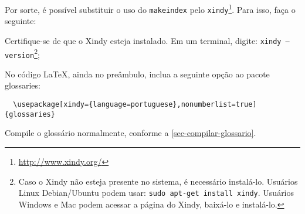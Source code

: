 Por sorte, é possível substituir o uso do \texttt{makeindex}
pelo \texttt{xindy}\footnote{\url{http://www.xindy.org/}}. Para isso, faça o
seguinte:

\begin{alineas}
  \item Certifique-se de que o Xindy esteja instalado. Em um terminal, digite:
  \texttt{xindy --version}\footnote{Caso o Xindy não esteja presente no sistema, é necessário
    instalá-lo. Usuários Linux Debian/Ubuntu podem usar: \texttt{sudo
    apt-get install xindy}. Usuários Windows e Mac podem acessar a página do
    Xindy, baixá-lo e instalá-lo.};
  \item No código LaTeX, ainda no preâmbulo, inclua a seguinte opção ao pacote glossaries:
  \begin{verbatim}
  \usepackage[xindy={language=portuguese},nonumberlist=true]{glossaries}
  \end{verbatim}
  \item Compile o glossário normalmente, conforme a
  \autoref{sec-compilar-glossario}.
\end{alineas}
